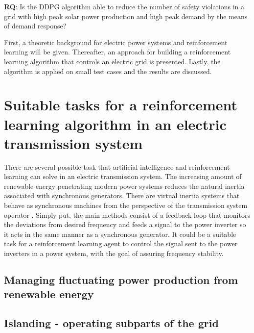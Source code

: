 \documentclass[class=book, crop=false]{standalone}
\begin{document}
\begin{displayquote}
\textbf{RQ}: Is the DDPG algorithm able to reduce the number of safety violations in a grid with high peak solar power production and high peak demand by the means of demand response? 
\end{displayquote}

First, a theoretic background for electric power systems and reinforcement learning will be given. Thereafter, an approach for building a reinforcement learning algorithm that controls an electric grid is presented. Lastly, the algorithm is applied on small test cases and the results are discussed.


\section{Suitable tasks for a reinforcement learning algorithm in an electric transmission system}

There are several possible task that artificial intelligence and reinforcement learning can solve in an electric transmission system. The increasing amount of renewable energy penetrating modern power systems reduces the natural inertia associated with synchronous generators. There are virtual inertia systems that behave as synchronous machines from the perspective of the transmission system operator \cite{virtual_inertia}. Simply put, the main methods consist of a feedback loop that monitors the deviations from desired frequency and feeds a signal to the power inverter so it acts in the same manner as a synchronous generator. It could be a suitable task for a reinforcement learning agent to control the signal sent to the power inverters in a power system, with the goal of assuring frequency stability.



\subsection{Managing fluctuating power production from renewable energy}

\subsection{Islanding - operating subparts of the grid}
\end{document}
